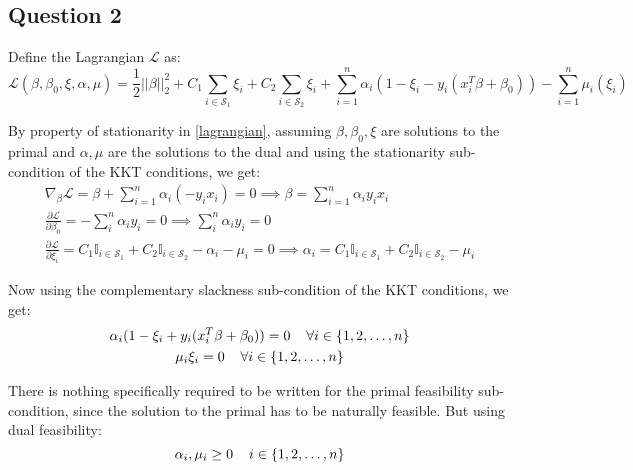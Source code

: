 \documentclass{article}
\newcommand{\indi}{\mathbb{I}}
\newcommand{\setS}{\mathcal{S}}
\newcommand{\lagL}{\mathcal{L}}
\begin{document}
\subsection*{Question 2}
\begin{flushleft}
Define the Lagrangian \(\mathcal{L}\) as:
\begin{equation}
\label{lagrangian}
\displaystyle \lagL(\beta, \beta_{0}, \xi, \alpha, \mu) = \frac{1}{2}||\beta||_{2}^{2} + C_{1}\sum_{i \in \setS_{1}}\xi_{i} + C_{2}\sum_{i \in \setS_{2}}\xi_{i} + \sum_{i=1}^{n}\alpha_{i}(1 - \xi_{i} - y_{i}(x_{i}^{T}\beta + \beta_{0})) - \sum_{i=1}^{n}\mu_{i}(\xi_{i})
\end{equation}

By property of stationarity in \ref{lagrangian}, assuming \(\beta, \beta_{0}, \xi\) are solutions to the primal and \(\alpha, \mu\) are the solutions to the dual and using the stationarity sub-condition of the KKT conditions, we get:
\begin{gather}
\label{stationarity-beta}
\displaystyle \nabla_{\beta} \lagL = \beta + \sum_{i=1}^{n}\alpha_{i}(-y_{i}x_{i}) = 0 \implies \beta = \sum_{i=1}^{n}\alpha_{i}y_{i}x_{i} \\
\label{stationarity-beta-0}
\displaystyle \frac{\partial \lagL}{\partial \beta_{0}} = -\sum_{i}^{n}\alpha_{i}y_{i} = 0 \implies \sum_{i}^{n}\alpha_{i}y_{i} = 0 \\
\label{stationarity-xi}
\displaystyle \frac{\partial \lagL}{\partial \xi_{i}} = C_{1}\indi_{i \in \setS_{1}} + C_{2}\indi_{i \in \setS_{2}} - \alpha_{i} - \mu_{i} = 0 \implies \alpha_{i} = C_{1}\indi_{i \in \setS_{1}} + C_{2}\indi_{i \in \setS_{2}} - \mu_{i}
\end{gather}

Now using the complementary slackness sub-condition of the KKT conditions, we get:
\begin{gather}
\label{compl-slack-alpha}
\displaystyle \alpha_{i}(1 - \xi_{i} + y_{i}(x_{i}^{T}\beta + \beta_{0})) = 0 \hspace{4mm} \forall i \in \{1, 2, \ldots, n\} \\
\label{compl-slack-mu}
\displaystyle \mu_{i}\xi_{i} = 0 \hspace{4mm} \forall i \in \{1, 2, \ldots, n\}
\end{gather}

There is nothing specifically required to be written for the primal feasibility sub-condition, since the solution to the primal has to be naturally feasible. But using dual feasibility:
\begin{equation}
\label{dual-fease}
\alpha_{i}, \mu_{i} \geq 0 \hspace{4mm} i \in \{1, 2, \ldots, n\}
\end{equation}
\end{flushleft}
\end{document}
